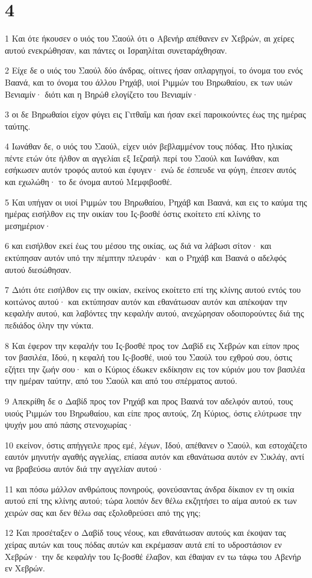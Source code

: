 \chapter{4}

\par 1 Και ότε ήκουσεν ο υιός του Σαούλ ότι ο Αβενήρ απέθανεν εν Χεβρών, αι χείρες αυτού ενεκρώθησαν, και πάντες οι Ισραηλίται συνεταράχθησαν.
\par 2 Είχε δε ο υιός του Σαούλ δύο άνδρας, οίτινες ήσαν οπλαργηγοί, το όνομα του ενός Βαανά, και το όνομα του άλλου Ρηχάβ, υιοί Ριμμών του Βηρωθαίου, εκ των υιών Βενιαμίν· διότι και η Βηρώθ ελογίζετο του Βενιαμίν·
\par 3 οι δε Βηρωθαίοι είχον φύγει εις Γιτθαΐμ και ήσαν εκεί παροικούντες έως της ημέρας ταύτης.
\par 4 Ιωνάθαν δε, ο υιός του Σαούλ, είχεν υιόν βεβλαμμένον τους πόδας. Ήτο ηλικίας πέντε ετών ότε ήλθον αι αγγελίαι εξ Ιεζραήλ περί του Σαούλ και Ιωνάθαν, και εσήκωσεν αυτόν τροφός αυτού και έφυγεν· ενώ δε έσπευδε να φύγη, έπεσεν αυτός και εχωλώθη· το δε όνομα αυτού Μεμφιβοσθέ.
\par 5 Και υπήγαν οι υιοί Ριμμών του Βηρωθαίου, Ρηχάβ και Βαανά, και εις το καύμα της ημέρας εισήλθον εις την οικίαν του Ις-βοσθέ όστις εκοίτετο επί κλίνης το μεσημέριον·
\par 6 και εισήλθον εκεί έως του μέσου της οικίας, ως διά να λάβωσι σίτον· και εκτύπησαν αυτόν υπό την πέμπτην πλευράν· και ο Ρηχάβ και Βαανά ο αδελφός αυτού διεσώθησαν.
\par 7 Διότι ότε εισήλθον εις την οικίαν, εκείνος εκοίτετο επί της κλίνης αυτού εντός του κοιτώνος αυτού· και εκτύπησαν αυτόν και εθανάτωσαν αυτόν και απέκοψαν την κεφαλήν αυτού, και λαβόντες την κεφαλήν αυτού, ανεχώρησαν οδοιπορούντες διά της πεδιάδος όλην την νύκτα.
\par 8 Και έφερον την κεφαλήν του Ις-βοσθέ προς τον Δαβίδ εις Χεβρών και είπον προς τον βασιλέα, Ιδού, η κεφαλή του Ις-βοσθέ, υιού του Σαούλ του εχθρού σου, όστις εζήτει την ζωήν σου· και ο Κύριος έδωκεν εκδίκησιν εις τον κύριόν μου τον βασιλέα την ημέραν ταύτην, από του Σαούλ και από του σπέρματος αυτού.
\par 9 Απεκρίθη δε ο Δαβίδ προς τον Ρηχάβ και προς Βαανά τον αδελφόν αυτού, τους υιούς Ριμμών του Βηρωθαίου, και είπε προς αυτούς, Ζη Κύριος, όστις ελύτρωσε την ψυχήν μου από πάσης στενοχωρίας·
\par 10 εκείνον, όστις απήγγειλε προς εμέ, λέγων, Ιδού, απέθανεν ο Σαούλ, και εστοχάζετο εαυτόν μηνυτήν αγαθής αγγελίας, επίασα αυτόν και εθανάτωσα αυτόν εν Σικλάγ, αντί να βραβεύσω αυτόν διά την αγγελίαν αυτού·
\par 11 και πόσω μάλλον ανθρώπους πονηρούς, φονεύσαντας άνδρα δίκαιον εν τη οικία αυτού επί της κλίνης αυτού; τώρα λοιπόν δεν θέλω εκζητήσει το αίμα αυτού εκ των χειρών σας και δεν θέλω σας εξολοθρεύσει από της γης;
\par 12 Και προσέταξεν ο Δαβίδ τους νέους, και εθανάτωσαν αυτούς και έκοψαν τας χείρας αυτών και τους πόδας αυτών και εκρέμασαν αυτά επί το υδροστάσιον εν Χεβρών· την δε κεφαλήν του Ις-βοσθέ έλαβον, και έθαψαν εν τω τάφω του Αβενήρ εν Χεβρών.

